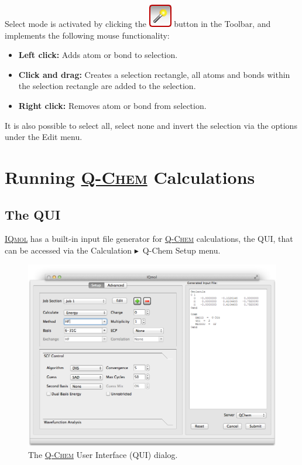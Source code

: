 \documentclass[a4paper,12pt]{article}
\newcommand{\qchem}{\href{http://q-chem.com}{{\scshape Q-Chem}}}
\newcommand{\iqmol}{\href{http://iqmol.org}{{\scshape IQmol}}}
\newcommand{\bt}{\ensuremath{\blacktriangleright}}
\begin{document}
Select mode is activated by clicking the
\includegraphics[scale=0.40]{figures/SelectButton.png} button in the Toolbar,
and implements the following mouse functionality:
\begin{itemize}
\item {\bf Left click:} Adds atom or bond to selection. 
\item {\bf Click and drag:} Creates a selection rectangle, all atoms and bonds
           within the selection rectangle are added to the selection. 
\item {\bf Right click:}  Removes atom or bond from selection.
\end{itemize}
It is also possible to select all, select none and invert the selection via
the options under the Edit menu.




\newpage
\section{Running \qchem{} Calculations}

\subsection{The QUI}

\iqmol{} has a built-in input file generator for \qchem{} calculations, the
QUI, that can be accessed via the Calculation \bt\  Q-Chem Setup menu.  
\begin{figure}[h]
\begin{center}
\includegraphics[scale=0.4]{figures/QUI.png}
\caption{The \qchem{} User Interface (QUI) dialog.}
\end{center}
\end{figure}
\end{document}
